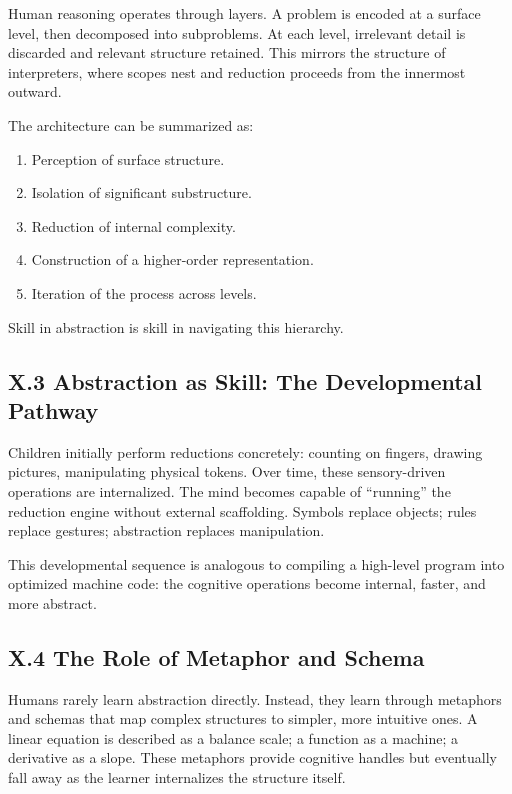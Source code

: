 \documentclass[12pt,letterpaper]{article}
\theoremstyle{remark}
\begin{document}
Human reasoning operates through layers. A problem is encoded at a surface level, then decomposed into subproblems. At each level, irrelevant detail is discarded and relevant structure retained. This mirrors the structure of interpreters, where scopes nest and reduction proceeds from the innermost outward.

The architecture can be summarized as:

\begin{enumerate}
    \item Perception of surface structure.
    \item Isolation of significant substructure.
    \item Reduction of internal complexity.
    \item Construction of a higher-order representation.
    \item Iteration of the process across levels.
\end{enumerate}

Skill in abstraction is skill in navigating this hierarchy.

\subsection{X.3 Abstraction as Skill: The Developmental Pathway}

Children initially perform reductions concretely: counting on fingers, drawing pictures, manipulating physical tokens. Over time, these sensory-driven operations are internalized. The mind becomes capable of ``running'' the reduction engine without external scaffolding. Symbols replace objects; rules replace gestures; abstraction replaces manipulation.

This developmental sequence is analogous to compiling a high-level program into optimized machine code: the cognitive operations become internal, faster, and more abstract.

\subsection{X.4 The Role of Metaphor and Schema}

Humans rarely learn abstraction directly. Instead, they learn through metaphors and schemas that map complex structures to simpler, more intuitive ones. A linear equation is described as a balance scale; a function as a machine; a derivative as a slope. These metaphors provide cognitive handles but eventually fall away as the learner internalizes the structure itself.
\end{document}

